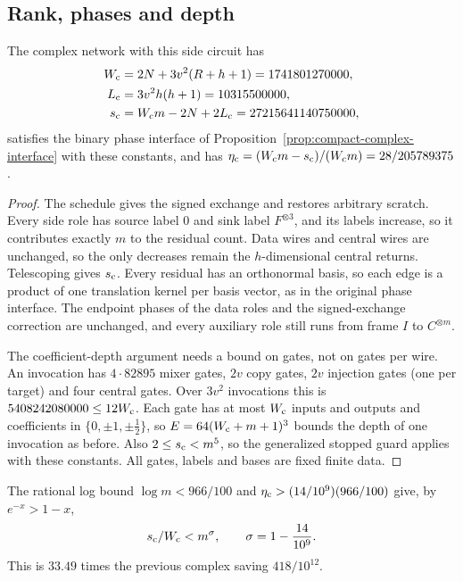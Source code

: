 \subsection{Rank, phases and depth}
\begin{proposition}\label{prop:compressed-complex-interface}
The complex network with this side circuit has
\begin{align*}
 W_{\rm c}&=2N+3v^2(R+h+1)=1741801270000,\\
 L_{\rm c}&=3v^2h(h+1)=10315500000,\\
 s_{\rm c}&=W_{\rm c}m-2N+2L_{\rm c}=27215641140750000,
\end{align*}
satisfies the binary phase interface of
Proposition~\ref{prop:compact-complex-interface} with these constants, and has
$\eta_{\rm c}=(W_{\rm c}m-s_{\rm c})/(W_{\rm c}m)=28/205789375$.
\end{proposition}
\begin{proof}
The schedule gives the signed exchange and restores arbitrary scratch. Every
side role has source label $0$ and sink label $F^{\otimes3}$, and its labels
increase, so it contributes exactly $m$ to the residual count. Data wires and
central wires are unchanged, so the only decreases remain the $h$-dimensional
central returns. Telescoping gives $s_{\rm c}$. Every residual has an
orthonormal basis, so each edge is a product of one translation kernel per
basis vector, as in the original phase interface. The endpoint phases of the
data roles and the signed-exchange correction are unchanged, and every
auxiliary role still runs from frame $I$ to $C^{\otimes m}$.

The coefficient-depth argument needs a bound on gates, not on gates per wire.
An invocation has $4\cdot82895$ mixer gates, $2v$ copy gates, $2v$ injection
gates (one per target) and four central gates. Over $3v^2$ invocations this is
$5408242080000\le12W_{\rm c}$. Each gate has at most $W_{\rm c}$ inputs and
outputs and coefficients in $\{0,\pm1,\pm\frac12\}$, so
$E=64(W_{\rm c}+m+1)^3$ bounds the depth of one invocation as before. Also
$2\le s_{\rm c}<m^5$, so the generalized stopped guard applies with these
constants. All gates, labels and bases are fixed finite data.
\end{proof}

The rational log bound $\log m<966/100$ and
$\eta_{\rm c}>(14/10^9)(966/100)$ give, by $e^{-x}>1-x$,
\begin{equation}\label{eq:compressed-complex-exponent}
 s_{\rm c}/W_{\rm c}<m^{\sigma},\qquad \sigma=1-\frac{14}{10^9}.
\end{equation}
This is $33.49$ times the previous complex saving $418/10^{12}$.

